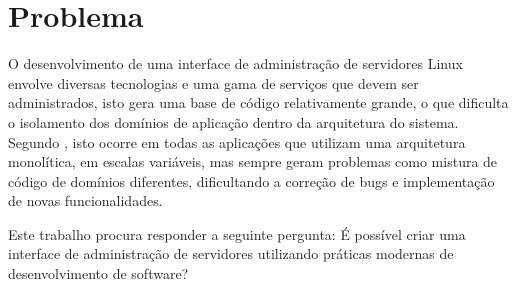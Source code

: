 \section{Problema}

  O desenvolvimento de uma interface de administração de servidores Linux
  envolve diversas tecnologias e uma gama de serviços que devem ser
  administrados, isto gera uma base de código relativamente grande, o que
  dificulta o isolamento dos domínios de aplicação dentro da arquitetura
  do sistema. Segundo , isto ocorre em todas as aplicações
  que utilizam uma arquitetura monolítica, em escalas variáveis, mas sempre
  geram problemas como mistura de código de domínios diferentes, dificultando
  a correção de bugs e implementação de novas funcionalidades.

  Este trabalho procura responder a seguinte pergunta: É possível criar
  uma interface de administração de servidores utilizando práticas modernas
  de desenvolvimento de software?
